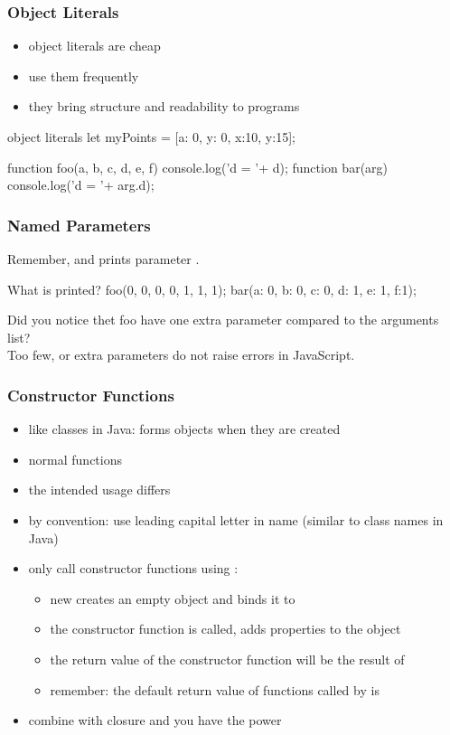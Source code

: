 \begin{frame}[fragile] \frametitle{Object Literals}
\begin{itemize}
  \item object literals are cheap
  \item use them frequently
  \item they bring structure and readability to programs
\end{itemize}
\begin{CodeBox}{object literals}
let myPoints = [{a: 0, y: 0}, {x:10, y:15}];

function foo(a, b, c, d, e, f) {
 console.log('d = '+ d);
}
function bar(arg) {
 console.log('d = '+ arg.d);
}
\end{CodeBox}
\end{frame}

\begin{frame}[fragile] \frametitle{Named Parameters}
Remember,  and  prints parameter .
\vspace{5mm}
\begin{CodeBox}{What is printed?}
foo(0, 0, 0, 0, 1, 1, 1);
bar({a: 0, b: 0, c: 0, d: 1, e: 1, f:1});
\end{CodeBox}
\vspace{10mm}
Did you notice thet foo have one extra parameter compared to the arguments list?
\\ Too few, or extra parameters do not raise errors in JavaScript. 
\end{frame}

\begin{frame}[fragile] \frametitle{Constructor Functions}

\begin{itemize}
  \item like classes in Java: forms objects when they are created
  \item normal functions
  \item the intended usage differs
  \item by convention: use leading capital letter in name (similar to class names in Java)
  \item only call constructor functions using :
  \begin{itemize}
    \item new creates an empty object and binds it to 
    \item the constructor function is called, adds properties to the object
    \item the return value of the constructor function will be the result of 
    \item remember: the default return value of functions called by  is 
  \end{itemize}
  \item combine with closure and you have the power
\end{itemize}
\end{frame}

